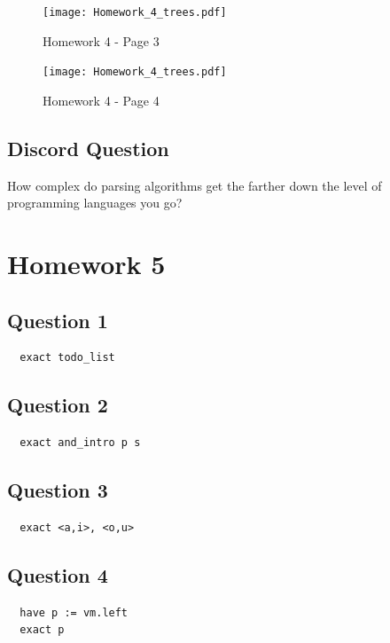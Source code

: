 \documentclass{article}
\theoremstyle{plain}
\theoremstyle{definition}
\theoremstyle{remark}
\begin{document}
\begin{figure}[H]
  \centering
  \texttt{[image: Homework\_4\_trees.pdf]}
  \caption{Homework 4 - Page 3}
  \label{fig:homework4_page3}
\end{figure}

\begin{figure}[H]
  \centering
  \texttt{[image: Homework\_4\_trees.pdf]}
  \caption{Homework 4 - Page 4}
  \label{fig:homework4_page4}
\end{figure}

\subsection{Discord Question}

How complex do parsing algorithms get the farther down the level of programming languages you go?


\section{Homework 5}\label{homework5}

\subsection{Question 1}

\begin{lstlisting}
  exact todo_list
\end{lstlisting}

\subsection{Question 2}

\begin{lstlisting}
  exact and_intro p s
\end{lstlisting}

\subsection{Question 3}

\begin{lstlisting}
  exact <a,i>, <o,u>
\end{lstlisting}

\subsection{Question 4}

\begin{lstlisting}
  have p := vm.left
  exact p
\end{lstlisting}
\end{document}
